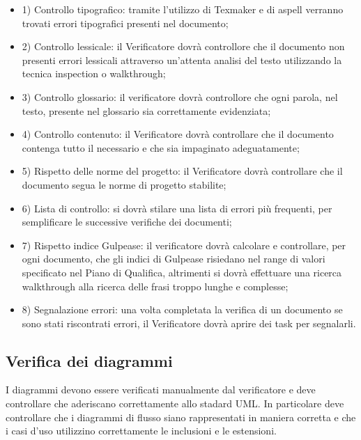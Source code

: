 \begin{itemize}
	\item 1) Controllo tipografico: tramite l'utilizzo di Texmaker e di aspell verranno trovati errori tipografici presenti nel documento;
	\item 2) Controllo lessicale: il Verificatore dovrà controllore che il documento non presenti errori lessicali attraverso un'attenta analisi del testo utilizzando la tecnica inspection o walkthrough;
	\item 3) Controllo glossario: il verificatore dovrà controllore che ogni parola, nel testo, presente nel glossario sia correttamente evidenziata;
	\item 4) Controllo contenuto: il Verificatore dovrà controllare che il documento contenga tutto il necessario e che sia impaginato adeguatamente;
	\item 5) Rispetto delle norme del progetto: il Verificatore dovrà controllare che il documento segua le norme di progetto stabilite;
	\item 6) Lista di controllo: si dovrà stilare una lista di errori più frequenti, per semplificare le successive verifiche dei documenti;
	\item 7) Rispetto indice Gulpease: il verificatore dovrà calcolare e controllare, per ogni documento, che gli indici di Gulpease risiedano nel range di valori specificato nel Piano di Qualifica, altrimenti si dovrà effettuare una ricerca walkthrough alla ricerca delle frasi troppo lunghe e complesse;
	\item 8) Segnalazione errori: una volta completata la verifica di un documento se sono stati riscontrati errori, il Verificatore dovrà aprire dei task per segnalarli.
\end{itemize}

\subsection{Verifica dei diagrammi}

I diagrammi devono essere verificati manualmente dal verificatore e deve controllare che aderiscano correttamente allo stadard UML.
In particolare deve controllare che i diagrammi di flusso siano rappresentati in maniera corretta e che i casi d'uso utilizzino correttamente le inclusioni e le estensioni.